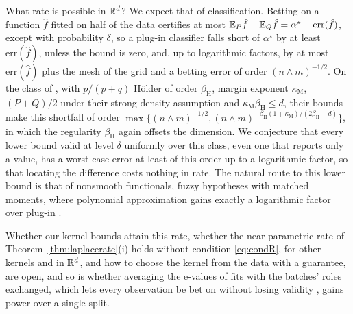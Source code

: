 What rate is possible in $\mathbb{R}^d$? We expect that of classification. Betting on a function $\hat f$ fitted on half of the data certifies
at most $\mathbb{E}_P\hat f-\mathbb{E}_Q\hat f=\alpha^\star-\mathrm{err}(\hat f)$, except with probability $\delta$, so a plug-in
classifier falls short of $\alpha^\star$ by at least $\mathrm{err}(\hat f)$, unless the bound is zero, and, up to logarithmic factors, by at most
$\mathrm{err}(\hat f)$ plus the mesh of the grid and a betting error of order $(n\wedge m)^{-1/2}$. On
the class of \citet[Section~3]{audibert2007fast}, with $p/(p+q)$ H\"older of order $\beta_{\mathrm H}$, margin exponent
$\kappa_{\mathrm M}$, $(P+Q)/2$ under their strong density assumption and $\kappa_{\mathrm M}\beta_{\mathrm H}\le d$, their
bounds make this shortfall of order
$\max\{(n\wedge m)^{-1/2},(n\wedge m)^{-\beta_{\mathrm H}(1+\kappa_{\mathrm M})/(2\beta_{\mathrm H}+d)}\}$, in which the
regularity $\beta_{\mathrm H}$ again offsets the dimension. We conjecture
that every lower bound valid at level $\delta$ uniformly over this class, even one that reports only a value, has a
worst-case error at least of this order up to a logarithmic factor, so that locating the difference costs nothing in
rate. The natural route to this lower bound is that of nonsmooth functionals, fuzzy hypotheses with matched moments,
where polynomial approximation gains
exactly a logarithmic factor over plug-in \citep{lepski1999estimation,cai2011testing,han2020estimation}.

Whether our kernel bounds attain this rate, whether the near-parametric rate of Theorem~\ref{thm:laplacerate}(i) holds without
condition \eqref{eq:condR}, for other kernels and in $\mathbb{R}^d$, and how to choose the kernel from the data with a
guarantee, are open, and so is whether averaging the e-values of fits with the batches' roles exchanged, which lets
every observation be bet on without losing validity \citep{vovk2021evalues}, gains power over a single split.
